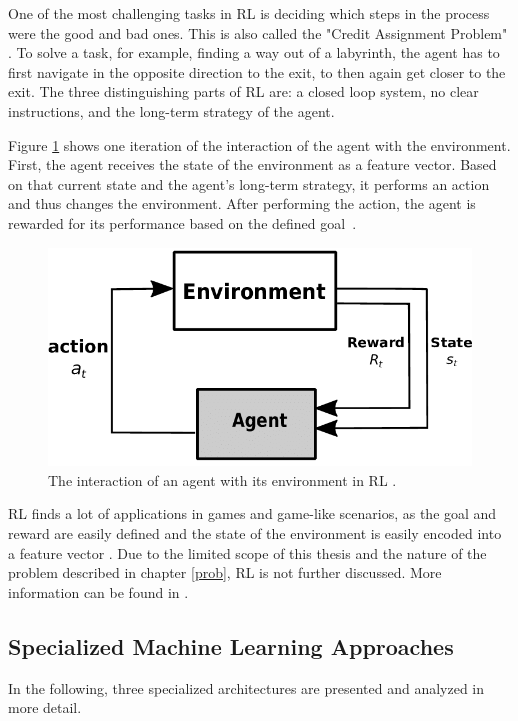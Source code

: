 One of the most challenging tasks in RL is deciding which steps in the process were the good and bad ones. This is also called the "Credit Assignment Problem" \cite{Minsky,Bishop}. To solve a task, for example, finding a way out of a labyrinth, the agent has to first navigate in the opposite direction to the exit, to then again get closer to the exit. The three distinguishing parts of RL are: a closed loop system, no clear instructions, and the long-term strategy of the agent. \cite{Sutton}

Figure \ref{fig:SimpleRL} shows one iteration of the interaction of the agent with the environment. First, the agent receives the state of the environment as a feature vector. Based on that current state and the agent's long-term strategy, it performs an action and thus changes the environment. After performing the action, the agent is rewarded for its performance based on the defined goal~\cite{LEX}.

\begin{figure}[H]
	\centering
	\includegraphics[width=0.5\linewidth]{IMGs/SimpleRL.png}
	\caption{The interaction of an agent with its environment in RL \cite{LEX}.}
	\label{fig:SimpleRL}
\end{figure}
RL finds a lot of applications in games and game-like scenarios, as the goal and reward are easily defined and the state of the environment is easily encoded into a feature vector \cite{Takuma}.
Due to the limited scope of this thesis and the nature of the problem described in chapter \ref{prob}, RL is not further discussed. More information can be found in \cite{Sutton}.
 

\subsection{Specialized Machine Learning Approaches}
In the following, three specialized architectures are presented and analyzed in more detail.
